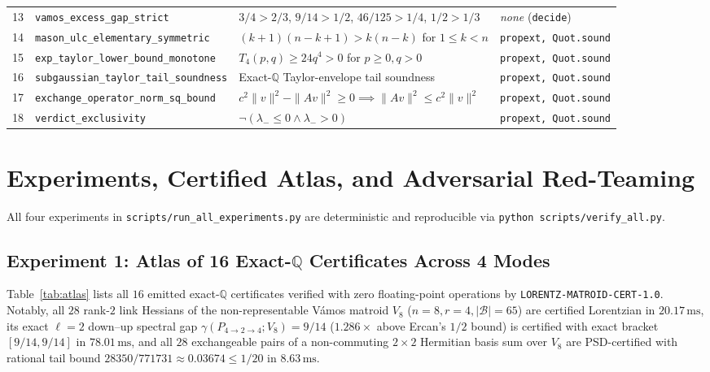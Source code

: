 \documentclass[11pt,a4paper]{article}
\theoremstyle{definition}
\theoremstyle{remark}
\newcommand{\QQ}{\mathbb{Q}}
\newcommand{\certschema}{\texttt{LORENTZ-MATROID-CERT-1.0}}
\begin{document}
\begin{table}[t]
\begin{tabular}{@{}clll@{}}
13 & \texttt{vamos\_excess\_gap\_strict} & $3/4 > 2/3$, $9/14 > 1/2$, $46/125 > 1/4$, $1/2 > 1/3$ & \emph{none} (\texttt{decide}) \\
14 & \texttt{mason\_ulc\_elementary\_symmetric} & $(k+1)(n-k+1) > k(n-k)$ for $1 \le k < n$ & \texttt{propext, Quot.sound} \\
15 & \texttt{exp\_taylor\_lower\_bound\_monotone} & $T_4(p,q) \ge 24 q^4 > 0$ for $p \ge 0, q > 0$ & \texttt{propext, Quot.sound} \\
16 & \texttt{subgaussian\_taylor\_tail\_soundness} & Exact-$\QQ$ Taylor-envelope tail soundness & \texttt{propext, Quot.sound} \\
17 & \texttt{exchange\_operator\_norm\_sq\_bound} & $c^2\|v\|^2 - \|Av\|^2 \ge 0 \implies \|Av\|^2 \le c^2\|v\|^2$ & \texttt{propext, Quot.sound} \\
18 & \texttt{verdict\_exclusivity} & $\neg(\lambda_- \le 0 \wedge \lambda_- > 0)$ & \texttt{propext, Quot.sound} \\
\bottomrule
\end{tabular}
\end{table}

\section{Experiments, Certified Atlas, and Adversarial Red-Teaming}\label{sec:experiments}

All four experiments in \texttt{scripts/run\_all\_experiments.py} are deterministic and reproducible via \texttt{python scripts/verify\_all.py}.

\subsection{Experiment 1: Atlas of 16 Exact-\texorpdfstring{$\QQ$}{Q} Certificates Across 4 Modes}

Table~\ref{tab:atlas} lists all $16$ emitted exact-$\QQ$ certificates verified with zero floating-point operations by \certschema{}. Notably, all $28$ rank-$2$ link Hessians of the non-representable V\'amos matroid $V_8$ ($n=8, r=4, |\mathcal{B}|=65$) are certified Lorentzian in $20.17\,\mathrm{ms}$, its exact $\ell=2$ down--up spectral gap $\gamma(P_{4\to 2\to 4}; V_8) = 9/14$ ($1.286\times$ above Ercan's $1/2$ bound) is certified with exact bracket $[9/14, 9/14]$ in $78.01\,\mathrm{ms}$, and all $28$ exchangeable pairs of a non-commuting $2\times 2$ Hermitian basis sum over $V_8$ are PSD-certified with rational tail bound $28350/771731 \approx 0.03674 \le 1/20$ in $8.63\,\mathrm{ms}$.
\end{document}
